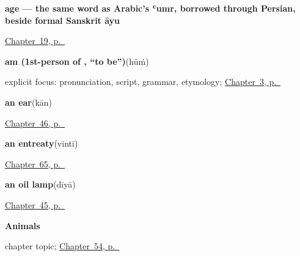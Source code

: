 \noindent\begin{minipage}[t]{\linewidth}
\raggedright
\textbf{age — the same word as Arabic's ʿumr, borrowed through Persian, beside formal Sanskrit āyu}\enspace\emph{}\par
\footnotesize \hyperref[ch:hi-asking-age]{Chapter~19, p.~\pageref*{ch:hi-asking-age}}
\end{minipage}\par\smallskip

\noindent\begin{minipage}[t]{\linewidth}
\raggedright
\textbf{am (1st-person of , \textquotedblleft{}to be\textquotedblright{})}\enspace\emph{}\enspace(hūṁ)\par
\footnotesize explicit focus: pronunciation, script, grammar, etymology; \hyperref[ch:responding]{Chapter~3, p.~\pageref*{ch:responding}}
\end{minipage}\par\smallskip

\noindent\begin{minipage}[t]{\linewidth}
\raggedright
\textbf{an ear}\enspace\emph{}\enspace(kān)\par
\footnotesize \hyperref[ch:hi-body-more]{Chapter~46, p.~\pageref*{ch:hi-body-more}}
\end{minipage}\par\smallskip

\noindent\begin{minipage}[t]{\linewidth}
\raggedright
\textbf{an entreaty}\enspace\emph{}\enspace(vintī)\par
\footnotesize \hyperref[ch:hi-asking-nicely]{Chapter~65, p.~\pageref*{ch:hi-asking-nicely}}
\end{minipage}\par\smallskip

\noindent\begin{minipage}[t]{\linewidth}
\raggedright
\textbf{an oil lamp}\enspace\emph{}\enspace(dīyā)\par
\footnotesize \hyperref[ch:hi-ask-for]{Chapter~45, p.~\pageref*{ch:hi-ask-for}}
\end{minipage}\par\smallskip

\noindent\begin{minipage}[t]{\linewidth}
\raggedright
\textbf{Animals}\par
\footnotesize chapter topic; \hyperref[ch:hi-animals]{Chapter~54, p.~\pageref*{ch:hi-animals}}
\end{minipage}\par\smallskip

